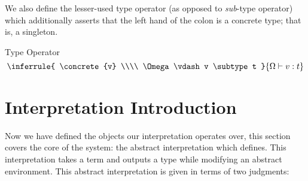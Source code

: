 \documentclass[12pt,twoside]{report}
\begin{document}





We also define the lesser-used type operator (as opposed to \textit{sub}-type operator) which additionally asserts that the left hand of the colon is a concrete type; that is, a singleton.

\begin{Definition}{Type Operator}{} \[
  \inferrule{
    \concrete{v} \\\\
    \Omega \vdash v \subtype t
  }{
    \Omega \vdash v: t
  }
\] \end{Definition}

\section{Interpretation Introduction}
\label{section:interpretationconcepts}
Now we have defined the objects our interpretation operates over, this section covers the core of the system: the abstract interpretation which defines. This interpretation takes a term and outputs a type while modifying an abstract environment. This abstract interpretation is given in terms of two judgments:
\end{document}
